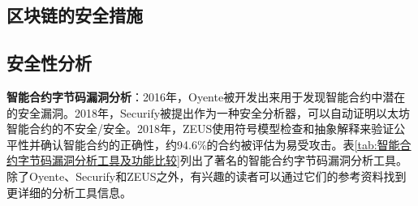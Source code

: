 \begin{translation}
\section{区块链的安全措施}
\subsection{安全性分析}

\textbf{智能合约字节码漏洞分析}：2016年，Oyente被开发出来用于发现智能合约中潜在的安全漏洞\cite{art89}。2018年，Securify被提出作为一种安全分析器，可以自动证明以太坊智能合约的不安全/安全\cite{art90}。2018年，ZEUS使用符号模型检查和抽象解释来验证公平性并确认智能合约的正确性，约94.6\%的合约被评估为易受攻击\cite{art91}。表\ref{tab:智能合约字节码漏洞分析工具及功能比较}列出了著名的智能合约字节码漏洞分析工具。除了Oyente、Securify和ZEUS之外，有兴趣的读者可以通过它们的参考资料找到更详细的分析工具信息。


\end{translation}
